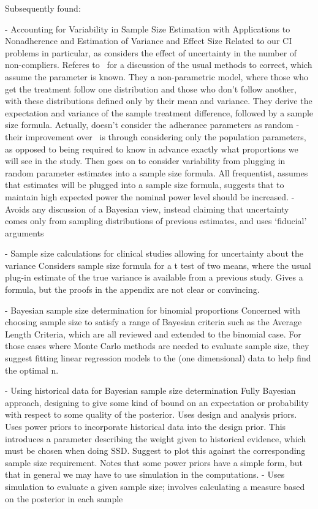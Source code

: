 \documentclass{article} %
\begin{document}
Subsequently found:

\cite{Fay2006} - Accounting for Variability in Sample Size Estimation with Applications to Nonadherence and Estimation of Variance and Effect Size
Related to our CI problems in particular, as considers the effect of uncertainty in the number of non-compliers. Referes to~\cite{Wittes2002} for a discussion of the usual methods to correct, which assume the parameter is known. They a non-parametric model, where those who get the treatment follow one distribution and those who don't follow another, with these distributions defined only by their mean and variance. They derive the expectation and variance of the sample treatment difference, followed by a sample size formula. Actually, doesn't consider the adherance parameters as random - their improvement over~\cite{Wittes2002} is through considering only the population parameters, as opposed to being required to know in advance exactly what proportions we will see in the study. Then goes on to consider variability from plugging in random parameter estimates into a sample size formula. All frequentist, assumes that estimates will be plugged into a sample size formula, suggests that to maintain high expected power the nominal power level should be increased.
- Avoids any discussion of a Bayesian view, instead claiming that uncertainty comes only from sampling distributions of previous estimates, and uses `fiducial' arguments

\cite{Julious2006} - Sample size calculations for clinical studies allowing for uncertainty about the variance
Considers sample size formula for a t test of two means, where the usual plug-in estimate of the true variance is available from a previous study. Gives a formula, but the proofs in the appendix are not clear or convincing.

\cite{MLan2008} - Bayesian sample size determination for binomial proportions
Concerned with choosing sample size to satisfy a range of Bayesian criteria such as the Average Length Criteria, which are all reviewed and extended to the binomial case. For those cases where Monte Carlo methods are needed to evaluate sample size, they suggest fitting linear regression models to the (one dimensional) data to help find the optimal n.

\cite{Santis2007} - Using historical data for Bayesian sample size determination
Fully Bayesian approach, designing to give some kind of bound on an expectation or probability with respect to some quality of the posterior. Uses design and analysis priors. Uses power priors to incorporate historical data into the design prior. This introduces a parameter describing the weight given to historical evidence, which must be chosen when doing SSD. Suggest to plot this against the corresponding sample size requirement. Notes that some power priors have a simple form, but that in general we may have to use simulation in the computations.
- Uses simulation to evaluate a given sample size; involves calculating a measure based on the posterior in each sample
\end{document}
